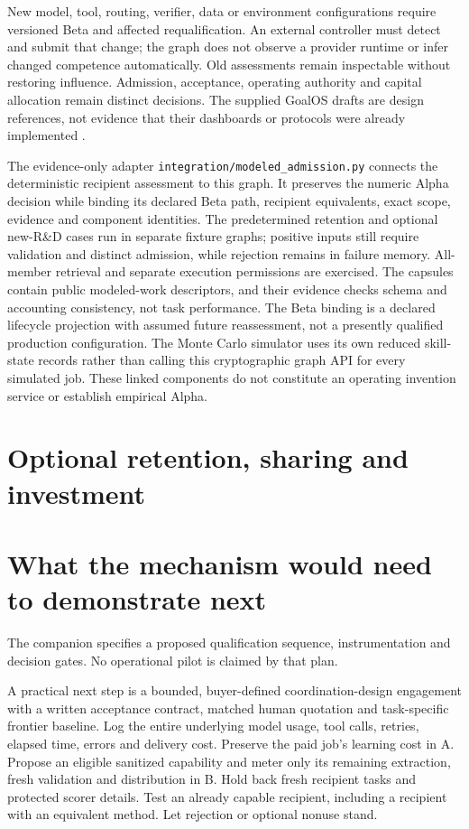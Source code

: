 \documentclass[11pt,letterpaper]{article}
\begin{document}
New model, tool, routing, verifier, data or environment configurations require
versioned Beta and affected requalification. An external controller must detect
and submit that change; the graph does not observe a provider runtime or infer
changed competence automatically. Old assessments remain inspectable
without restoring influence. Admission, acceptance, operating authority and
capital allocation remain distinct decisions. The supplied GoalOS drafts are
design references, not evidence that their dashboards or protocols were already
implemented \citep{merkle,proofloops}.

The evidence-only adapter \texttt{integration/modeled\_admission.py} connects the
deterministic recipient assessment to this graph. It preserves the numeric Alpha
decision while binding its declared Beta path, recipient equivalents, exact
scope, evidence and component identities. The predetermined retention and
optional new-R\&D cases run in separate fixture graphs; positive inputs still
require validation and distinct admission, while rejection remains in failure
memory. All-member retrieval and separate execution permissions are exercised.
The capsules contain public modeled-work descriptors, and their evidence checks
schema and accounting consistency, not task performance. The Beta binding is a
declared lifecycle projection with assumed future reassessment, not a presently
qualified production configuration. The Monte Carlo simulator uses its own
reduced skill-state records rather than calling this cryptographic graph API for
every simulated job. These linked components do not constitute an operating
invention service or establish empirical Alpha.

\section{Optional retention, sharing and investment}


\section{What the mechanism would need to demonstrate next}

The companion  specifies a proposed
qualification sequence, instrumentation and decision gates. No operational pilot
is claimed by that plan.

A practical next step is a bounded, buyer-defined coordination-design engagement
with a written acceptance contract, matched human quotation and task-specific
frontier baseline. Log the entire underlying model usage, tool calls, retries,
elapsed time, errors and delivery cost. Preserve the paid job's learning cost
in A. Propose an eligible sanitized capability and meter only its remaining
extraction, fresh validation and distribution in B. Hold back fresh recipient
tasks and protected scorer details. Test an already capable recipient, including
a recipient with an equivalent method. Let rejection or optional nonuse stand.
\end{document}
